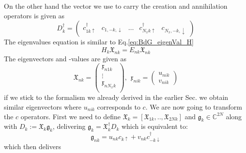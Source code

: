 \documentclass[../main.tex]{subfile}
\begin{document}
On the other hand the vector we use to carry the creation and annihilation operators is given as 
\[
    D_k^{\dagger} = \begin{pmatrix}
        c^{\dagger}_{1k\uparrow} & c_{1,-k,\downarrow}& \dots &c^{\dagger}_{N_x k\uparrow} & c_{N_x,-k,\downarrow}
    \end{pmatrix}
\]
The eigenvalues equation is similar to Eq.\ref{eq:BdG_eigenVal_H}
\begin{equation}\label{eq:BdG_eigenVal_H_k}
    H_k \mathfrak{X}_{nk} = E_{nk} \mathfrak{X}_{nk}
\end{equation}
The eigenvectors and -values are given as
\begin{equation*}
    \mathfrak{X}_{nk} = \begin{pmatrix}
        \mathfrak{x}_{n1k}\\
        \vdots\\
        \mathfrak{x}_{nN_xk}\\
    \end{pmatrix},~~ \mathfrak{x}_{nik} = \begin{pmatrix}
        u_{nik}\\
        v_{nik}
    \end{pmatrix}
\end{equation*}
if we stick to the formalism we already derived in the earlier Sec.\label{sec:Diagonalization} we obtain similar 
eigenvectors where $u_{nik}$ corresponds to $c$. We are now going to transform the $c$ operators. First we need
to define $\mathfrak{X}_k = [\mathfrak{X}_{1k}, ..,\mathfrak{X}_{2Nk}]$ and $\mathfrak{g}_k\in\mathbb{C}^{2N}$ along with $D_{k} := \mathfrak{X}_k\mathfrak{g}_k$, 
delivering $\mathfrak{g}_k = \mathfrak{X}^{\dagger}_k D_{k}$ which is equivalent to:
\begin{equation}
    \mathfrak{g}_{nk} = u_{nk}c_{k\uparrow} + v_{nk}c^{\dagger}_{-k\downarrow}
\end{equation}
which then delivers 
\end{document}
